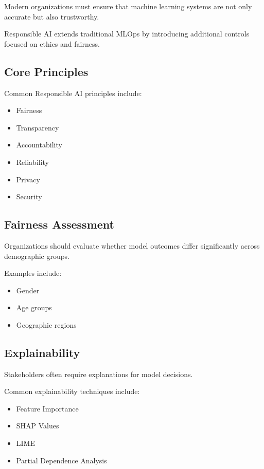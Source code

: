 Modern organizations must ensure that machine learning systems are not only accurate but also trustworthy.

Responsible AI extends traditional MLOps by introducing additional controls focused on ethics and fairness.

\subsection{Core Principles}

Common Responsible AI principles include:

\begin{itemize}
    \item Fairness
    \item Transparency
    \item Accountability
    \item Reliability
    \item Privacy
    \item Security
\end{itemize}

\subsection{Fairness Assessment}

Organizations should evaluate whether model outcomes differ significantly across demographic groups.

Examples include:

\begin{itemize}
    \item Gender
    \item Age groups
    \item Geographic regions
\end{itemize}

\subsection{Explainability}

Stakeholders often require explanations for model decisions.

Common explainability techniques include:

\begin{itemize}
    \item Feature Importance
    \item SHAP Values
    \item LIME
    \item Partial Dependence Analysis
\end{itemize}

